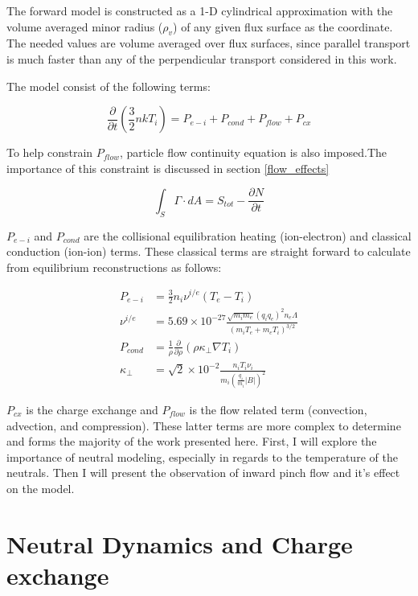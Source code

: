 \documentclass[aip, pop, preprint]{revtex4-1}
\begin{document}
The forward model is constructed as a 1-D cylindrical approximation with the
volume averaged minor radius ($ \rho_v $) of any given flux surface as the
coordinate. The needed values are volume averaged over flux surfaces, since
parallel transport is much faster than any of the perpendicular transport
considered in this work.

The model consist of the following terms:

\begin{equation}\label{eqn:balance}
\frac{\partial}{\partial t}\left(\frac{3}{2}nkT_{i}\right) = P_{e-i} + P_{cond} + P_{flow} + P_{cx} %
\end{equation}

To help constrain $P_{flow}$, particle flow continuity equation is also imposed.The importance of this constraint is discussed in section \ref{flow_effects}

\begin{equation}\label{eqn:cont}
\int_{S} \Gamma\cdot dA = S_{tot}-\frac{\partial N}{\partial t}
\end{equation}



$ P_{e-i} $ and $ P_{cond} $ are the collisional equilibration heating
(ion-electron) and classical conduction (ion-ion) terms. These classical terms
are straight forward to calculate from equilibrium reconstructions as follows:

\begin{align}\label{eqn:p_ei}
    P_{e-i} &= \frac{3}{2}n_i\nu^{i/e}(T_e - T_i)\\
    \nu^{i/e} &= 5.69\times10^{-27} \frac{\sqrt{m_i m_e}(q_i q_e)^2 n_e \Lambda}{(m_i T_e + m_e T_i)^{3/2}}\\
    P_{cond} &= \frac{1}{\rho}\frac{\partial}{\partial\rho}(\rho\kappa_{\perp}\nabla T_{i})\\
    \kappa_{\perp} &= \sqrt{2} \times 10^{-2}\frac{n_i T_i \nu_i}{m_i(\frac{q_i}{m_i} |B|)^2}
\end{align}

$P_{cx}$ is the charge exchange and $P_{flow}$ is the flow related term
(convection, advection, and compression). These latter terms are more complex
to determine and forms the majority of the work presented here. First, I will
explore the importance of neutral modeling, especially in regards to the
temperature of the neutrals. Then I will present the observation of inward
pinch flow and it's effect on the model.

\section{Neutral Dynamics and Charge exchange}\label{neutral}
\end{document}
